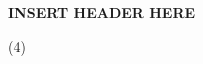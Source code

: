 \documentclass[17pt,a4paper,landscape]{extarticle}
\begin{document}
\sffamily
\boldmath

{\LARGE \textbf{INSERT HEADER HERE}}
\begin{tasks}(4)
\task 
\end{tasks}
\end{document}
